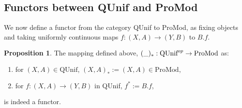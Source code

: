 \documentclass[a4paper]{article}
\theoremstyle{definition}
\newtheorem{prop}[theorem]{Proposition}
\begin{document}
			\subsection{Functors between QUnif and ProMod}
			We now define a functor from the category QUnif to ProMod, as fixing objects and taking uniformly
			continuous maps $f:(X,A)\to(Y,B)$ to $B.f$.

			\begin{prop} The mapping defined above, $(\string _)_*:\text{QUnif}^{op} \to \text{ProMod}$ as:
				\begin{enumerate}[label=(\alph*)]
					\item for $(X,A) \in \text{QUnif}$, $(X,A)_*:=(X,A) \in \text{ProMod}$,
					\item for $f:(X,A) \to (Y,B)$ in QUnif,
						$f^* := B.f$,
				\end{enumerate}
				is indeed a functor.
			\end{prop}
\end{document}
